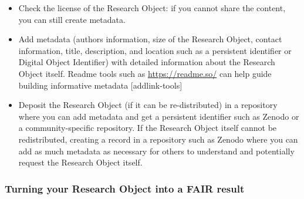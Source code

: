 \documentclass[
  letterpaper,
  DIV=11,
  numbers=noendperiod]{scrreport}
\providecommand{\tightlist}{%
  \setlength{\itemsep}{0pt}\setlength{\parskip}{0pt}}\usepackage{longtable,booktabs,array}
\begin{document}
\begin{itemize}
\tightlist
\item
  Check the license of the Research Object: if you cannot share the
  content, you can still create metadata.
\item
  Add metadata (authors information, size of the Research Object,
  contact information, title, description, and location such as a
  persistent identifier or Digital Object Identifier) with detailed
  information about the Research Object itself. Readme tools such as
  \url{https://readme.so/} can help guide building informative metadata
  {[}addlink-tools{]}
\item
  Deposit the Research Object (if it can be re-distributed) in a
  repository where you can add metadata and get a persistent identifier
  such as Zenodo or a community-specific repository. If the Research
  Object itself cannot be redistributed, creating a record in a
  repository such as Zenodo where you can add as much metadata as
  necessary for others to understand and potentially request the
  Research Object itself.
\end{itemize}

\hypertarget{turning-your-research-object-into-a-fair-result}{%
\subsubsection{Turning your Research Object into a FAIR
result}\label{turning-your-research-object-into-a-fair-result}}
\end{document}
